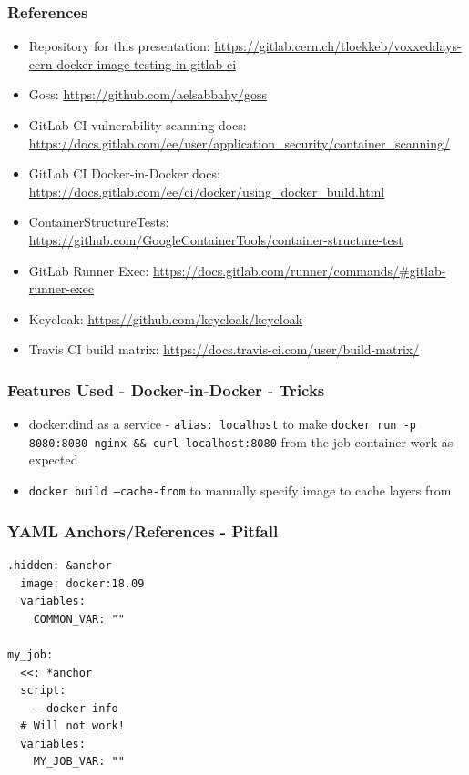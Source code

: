 \documentclass[14pt,aspectratio=169]{beamer}
\begin{document}
\begin{frame}
  \frametitle{References}
  { 
    \scriptsize
    \begin{itemize}
      \item Repository for this presentation: \url{https://gitlab.cern.ch/tloekkeb/voxxeddays-cern-docker-image-testing-in-gitlab-ci}
      \item Goss: \url{https://github.com/aelsabbahy/goss}
      \item GitLab CI vulnerability scanning docs: \url{https://docs.gitlab.com/ee/user/application_security/container_scanning/}
      \item GitLab CI Docker-in-Docker docs: \url{https://docs.gitlab.com/ee/ci/docker/using_docker_build.html}
      \item ContainerStructureTests: \url{https://github.com/GoogleContainerTools/container-structure-test}
      \item GitLab Runner Exec: \url{https://docs.gitlab.com/runner/commands/\#gitlab-runner-exec}
      \item Keycloak: \url{https://github.com/keycloak/keycloak}
      \item Travis CI build matrix: \url{https://docs.travis-ci.com/user/build-matrix/}
    \end{itemize}
  }
\end{frame}

\begin{frame}
  \frametitle{Features Used - Docker-in-Docker - Tricks}
  \begin{itemize}
    \item docker:dind as a service - \texttt{alias: localhost} to make \texttt{docker run -p 8080:8080 nginx && curl localhost:8080} from the job container work as expected
    \item \texttt{docker build --cache-from} to manually specify image to cache layers from
  \end{itemize}
\end{frame}

\begin{frame}[fragile]
  \frametitle{YAML Anchors/References - Pitfall}
  \begin{verbatim}
.hidden: &anchor
  image: docker:18.09
  variables:
    COMMON_VAR: ""

my_job:
  <<: *anchor
  script:
    - docker info
  # Will not work!
  variables:
    MY_JOB_VAR: ""
  \end{verbatim}
\end{frame}
\end{document}
